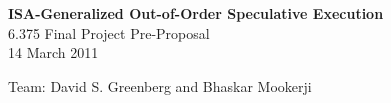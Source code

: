 \documentclass[12pt]{article}
\begin{document}
	\begin{center}
		\textbf{\large ISA-Generalized Out-of-Order Speculative Execution} \\
		6.375 Final Project Pre-Proposal\\
		14 March 2011 \\
		
		\vspace{\baselineskip}
		
		Team: David S. Greenberg and Bhaskar Mookerji
	\end{center}
	
	
\end{document}
